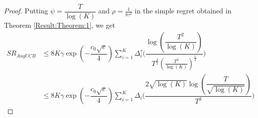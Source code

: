 \begin{proof}
Putting $\psi=\dfrac{T}{\log (K)}$ and $\rho=\frac{1}{8\tau^{2}}$ in the simple regret obtained in Theorem \ref{Result:Theorem:1}, we get
\begin{align*}
SR_{AugUCB} &\leq 8K \gamma \exp(-\dfrac{c_{0}\sqrt{e}}{4}) \sum_{i=1}^{K} \Delta_{i}^{\tau}  \bigg(\dfrac{\log (\dfrac{T^{2}}{\log (K)} )}{T^{\frac{3}{2}}(\frac{T^3}{\log (K)})^{\frac{1}{2}}}\bigg)\\
& \leq 8K \gamma \exp(-\dfrac{c_{0}\sqrt{e}}{4}) \sum_{i=1}^{K} \Delta_{i}  \bigg(\dfrac{2 \sqrt{\log (K)} \log (\dfrac{T}{\sqrt{\log (K)}} )}{T^{3}}\bigg)
\end{align*} 

\end{proof}